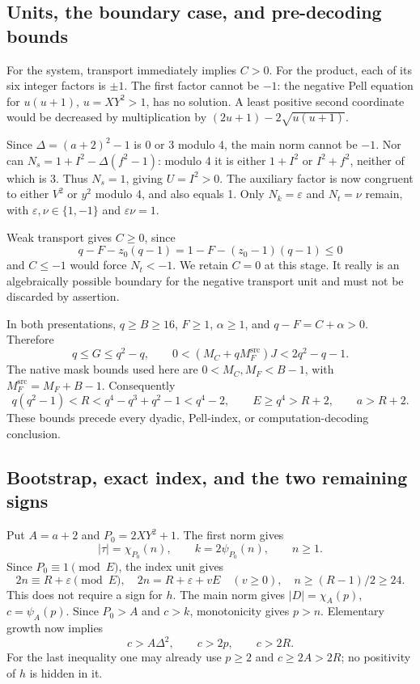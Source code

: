 \documentclass[11pt,a4paper]{article}
\theoremstyle{definition}\newtheorem{definition}[theorem]{Definition}
\theoremstyle{remark}\newtheorem{remark}[theorem]{Remark}
\newcommand{\MF}{M_F^{\mathrm{src}}}
\begin{document}
\subsection{Units, the boundary case, and pre-decoding bounds}

For the system, transport immediately implies \(C>0\). For the product,
each of its six integer factors is \(\pm1\). The first factor cannot
be \(-1\): the negative Pell equation for \(u(u+1)\), \(u=XY^2>1\),
has no solution. A least positive second coordinate would be decreased
by multiplication by \((2u+1)-2\sqrt{u(u+1)}\).

Since \(\Delta=(a+2)^2-1\) is 0 or 3 modulo 4, the main norm cannot
be \(-1\). Nor can \(N_s=1+I^2-\Delta(f^2-1)\): modulo 4 it is
either \(1+I^2\) or \(I^2+f^2\), neither of which is 3.
Thus \(N_s=1\), giving \(U=I^2>0\). The auxiliary factor is now
congruent to either \(V^2\) or \(y^2\) modulo 4, and also equals 1.
Only \(N_k=\varepsilon\) and \(N_t=\nu\) remain, with
\(\varepsilon,\nu\in\{1,-1\}\) and \(\varepsilon\nu=1\).

Weak transport gives \(C\ge0\), since
\[
 q-F-z_0(q-1)=1-F-(z_0-1)(q-1)\le0
\]
and \(C\le-1\) would force \(N_t<-1\). We retain \(C=0\)
at this stage. It really is an algebraically possible boundary for the
negative transport unit and must not be discarded by assertion.

In both presentations, \(q\ge B\ge16\), \(F\ge1\), \(\alpha\ge1\),
and \(q-F=C+\alpha>0\). Therefore
\[
 q\le G\le q^2-q,
 \qquad0<(M_C+q\MF)J<2q^2-q-1.
\]
The native mask bounds used here are \(0<M_C,M_F<B-1\), with
\(\MF=M_F+B-1\). Consequently
\begin{equation}\label{eq:Rbounds}
 q(q^2-1)<R<q^4-q^3+q^2-1<q^4-2,
 \qquad E\ge q^4>R+2,\qquad a>R+2.
\end{equation}
These bounds precede every dyadic, Pell-index, or computation-decoding
conclusion.

\subsection{Bootstrap, exact index, and the two remaining signs}

Put \(A=a+2\) and \(P_0=2XY^2+1\). The first norm gives
\[
 |\tau|=\chi_{P_0}(n),\qquad k=2\psi_{P_0}(n),\qquad n\ge1.
\]
Since \(P_0\equiv1\pmod E\), the index unit gives
\[
 2n\equiv R+\varepsilon\pmod E,
 \quad 2n=R+\varepsilon+vE\quad(v\ge0),
 \quad n\ge(R-1)/2\ge24.
\]
This does not require a sign for \(h\). The main norm gives
\(|D|=\chi_A(p)\), \(c=\psi_A(p)\). Since \(P_0>A\) and \(c>k\),
monotonicity gives \(p>n\). Elementary growth now implies
\[
 c>A\Delta^2,\qquad c>2p,\qquad c>2R.
\]
For the last inequality one may already use \(p\ge2\) and
\(c\ge2A>2R\); no positivity of \(h\) is hidden in it.
\end{document}
